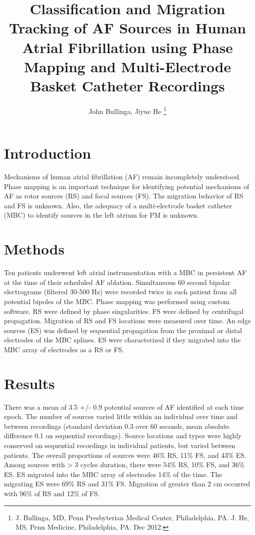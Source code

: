 \documentclass[journal,onecolumn]{IEEEtran} %
\begin{document}
\title{Classification and Migration Tracking of AF Sources in Human Atrial Fibrillation using Phase Mapping and Multi-Electrode Basket Catheter Recordings}

\author{John Bullinga, Jiyue He
\thanks{J. Bullinga, MD, Penn Presbyterian Medical Center, Philadelphia, PA. J. He, MS, Penn Medicine, Philadelphia, PA. Dec 2012.}}

\maketitle

\section{Introduction}
Mechanisms of human atrial fibrillation (AF) remain incompletely understood. Phase mapping is an important technique for identifying potential mechanisms of AF as rotor sources (RS) and focal sources (FS). The migration behavior of RS and FS is unknown. Also, the adequacy of a multi-electrode basket catheter (MBC) to identify sources in the left atrium for PM is unknown.

\section{Methods}
Ten patients underwent left atrial instrumentation with a MBC in persistent AF at the time of their scheduled AF ablation. Simultaneous 60 second bipolar electrograms (filtered 30-500 Hz) were recorded twice in each patient from all potential bipoles of the MBC. Phase mapping was performed using custom software. RS were defined by phase singularities. FS were defined by centrifugal propagation. Migration of RS and FS locations were measured over time. An edge sources (ES) was defined by sequential propagation from the proximal or distal electrodes of the MBC splines. ES were characterized if they migrated into the MBC array of electrodes as a RS or FS.

\section{Results}
There was a mean of 3.5 +/- 0.9 potential sources of AF identified at each time epoch. The number of sources varied little within an individual over time and between recordings (standard deviation 0.3 over 60 seconds, mean absolute difference 0.1 on sequential recordings). Source locations and types were highly conserved on sequential recordings in individual patients, but varied between patients. The overall proportions of sources were 46\% RS, 11\% FS, and 43\% ES. Among sources with > 3 cycles duration, there were 54\% RS, 10\% FS, and 36\% ES. ES migrated into the MBC array of electrodes 14\% of the time. The migrating ES were 69\% RS and 31\% FS. Migration of greater than 2 cm occurred with 96\% of RS and 12\% of FS.
\end{document}
